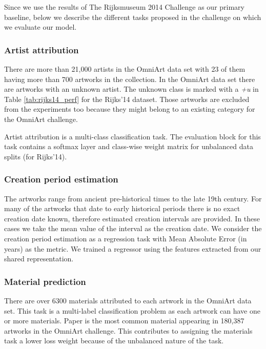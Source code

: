 \documentclass[sigconf]{acmart}
\begin{document}
Since we use the results of The Rijksmuseum 2014 Challenge as our primary baseline, below we describe the different tasks proposed in the challenge on which we evaluate our model.

\subsubsection{\textbf{Artist attribution}}

There are more than 21,000 artists in the OmniArt data set with 23 of them having more than 700 artworks in the collection. In the OmniArt data set there are artworks with an unknown artist. The unknown class is marked with a \textit{+u} in Table \ref{tab:rijks14_perf} for the Rijks'14 dataset. Those artworks are excluded from the experiments too because they might belong to an existing category for the OmniArt challenge. 

Artist attribution is a multi-class classification task. The evaluation block for this task contains a softmax layer and class-wise weight matrix for unbalanced data splits (for Rijks'14).

\subsubsection{\textbf{Creation period estimation}}

The artworks range from ancient pre-historical times to the late 19th century. For many of the artworks that date to early historical periods there is no exact creation date known, therefore estimated creation intervals are provided. In these cases we take the mean  value of the interval as the creation date. We consider the creation period estimation as a regression task with Mean Absolute Error (in years) as the metric. We trained a regressor using the features extracted from our shared representation.

\subsubsection{\textbf{Material prediction}}

There are over 6300 materials attributed to each artwork in the OmniArt data set. This task is a multi-label classification problem as each artwork can have one or more materials. Paper is the most common material appearing in 180,387 artworks in the OmniArt challenge. This contributes to assigning the materials task a lower loss weight because of the unbalanced nature of the task.
\end{document}
